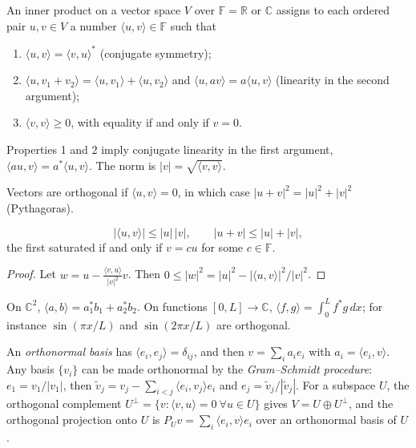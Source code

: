\begin{definition}
An inner product on a vector space $V$ over $\mathbb{F} = \mathbb{R}$ or $\mathbb{C}$ assigns to each ordered pair $u,v\in V$ a number $\langle u,v\rangle\in\mathbb{F}$ such that
\begin{enumerate}
    \item $\langle u,v\rangle = \langle v,u\rangle^*$ (conjugate symmetry);
    \item $\langle u,v_1+v_2\rangle = \langle u,v_1\rangle + \langle u,v_2\rangle$ and $\langle u,av\rangle = a\langle u,v\rangle$ (linearity in the second argument);
    \item $\langle v,v\rangle\ge0$, with equality if and only if $v = 0$.
\end{enumerate}
Properties 1 and 2 imply conjugate linearity in the first argument, $\langle au,v\rangle = a^*\langle u,v\rangle$. The norm is $|v| = \sqrt{\langle v,v\rangle}$.
\end{definition}

Vectors are orthogonal if $\langle u,v\rangle = 0$, in which case $|u+v|^2 = |u|^2+|v|^2$ (Pythagoras).

\begin{theorem}
\[
    |\langle u,v\rangle|\le|u|\,|v|,
    \qquad
    |u+v|\le|u|+|v|,
\]
the first saturated if and only if $v = cu$ for some $c\in\mathbb{F}$.
\end{theorem}
\begin{proof}
Let $w = u - \frac{\langle v,u\rangle}{|v|^2}v$. Then $0\le|w|^2 = |u|^2 - |\langle u,v\rangle|^2/|v|^2$.
\end{proof}

\begin{example}
On $\mathbb{C}^2$, $\langle a,b\rangle = a_1^*b_1 + a_2^*b_2$. On functions $[0,L]\to\mathbb{C}$, $\langle f,g\rangle = \int_0^Lf^*g\,dx$; for instance $\sin(\pi x/L)$ and $\sin(2\pi x/L)$ are orthogonal.
\end{example}

An \emph{orthonormal basis} has $\langle e_i,e_j\rangle = \delta_{ij}$, and then $v = \sum_ia_ie_i$ with $a_i = \langle e_i,v\rangle$. Any basis $\{v_i\}$ can be made orthonormal by the \emph{Gram--Schmidt procedure}: $e_1 = v_1/|v_1|$, then $\tilde{v}_j = v_j - \sum_{i<j}\langle e_i,v_j\rangle e_i$ and $e_j = \tilde{v}_j/|\tilde{v}_j|$. For a subspace $U$, the orthogonal complement $U^\perp = \{v : \langle v,u\rangle = 0\ \forall u\in U\}$ gives $V = U\oplus U^\perp$, and the orthogonal projection onto $U$ is $P_Uv = \sum_i\langle e_i,v\rangle e_i$ over an orthonormal basis of $U$.

